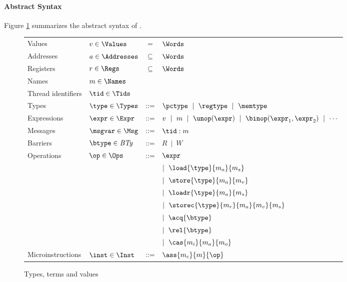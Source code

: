 \paragraph{Abstract Syntax}
Figure \ref{fig:types} summarizes the abstract syntax of \MCMIL.
%
\begin{figure}
\begin{tabular}{llcl}
Values & $v\in\Values$ & = & $\Words$ \\
Addresses & $a\in\Addresses$ & $\subseteq$ & $\Words$ \\
Registers & $r\in\Regs$ & $\subseteq$ & $\Words$ \\
Names & $m\in\Names$ \\
Thread identifiers & $\tid\in\Tids$ \\
Types & $\type\in\Types$ & ::= & $\pctype\ \mid\ \regtype\ \mid \ \memtype $ \\
Expressions & $\expr\in\Expr$ & ::= & $v\ \mid\ m\ \mid\ \unop(\expr)\ \mid\ \binop(\expr_1,\expr_2)\ \mid\ \cdots$  \\
Messages & $\msgvar\in \Msg$ & ::= & $\tid:m$ \\
Barriers & $\btype\in\mathit{BTy}$ & ::= & $ \mathit{R}\ \mid\ \mathit{W}$ \\
Operations & $\op\in\Ops$ & ::= & $\expr$ \\
  & & & $\mid \ \load{\type}{m_a}{m_s}$ \\
  & & & $\mid \ \store{\type}{m_a}{m_v}$ \\
  & & & $\mid\ \loadr{\type}{m_a}{m_s}$ \\
  & & & $\mid\ \storec{\type}{m_r}{m_a}{m_v}{m_s}$ \\
  & & & $\mid\ \acq{\btype}$ \\
  & & & $\mid\ \rel{\btype}$ \\
  & & & $\mid\ \cas{m_i}{m_a}{m_o} $ \\
Microinstructions & $\inst \in \Inst$ & ::= & $\ass{m_c}{m}{\op}$
\end{tabular}
\caption{Types, terms and values}
\label{fig:types}
\end{figure}
%

